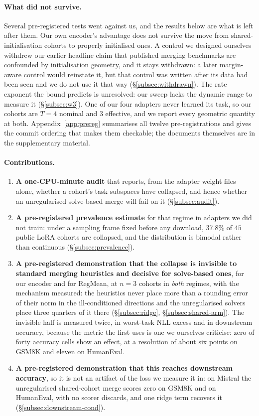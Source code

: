 \paragraph{What did not survive.} Several pre-registered tests went against
us, and the results below are what is left after them. Our own encoder's
advantage does not survive the move from shared-initialisation cohorts to
properly initialised ones. A control we designed ourselves withdrew our
earlier headline claim that published merging benchmarks are confounded by
initialisation geometry, and it stays withdrawn: a later margin-aware
control would reinstate it, but that control was written after its data had
been seen and we do not use it that way (\S\ref{subsec:withdrawn}). The rate exponent the bound predicts is unresolved:
our sweep lacks the dynamic range to measure it (\S\ref{subsec:w3}). One of our four adapters never learned its
task, so our cohorts are $T=4$ nominal and $3$ effective, and we report
every geometric quantity at both. Appendix~\ref{app:prereg} summarises all
twelve pre-registrations and gives the commit ordering that makes them
checkable;
the documents themselves are in the supplementary material.

\paragraph{Contributions.}
\begin{enumerate}
\item \textbf{A one-CPU-minute audit} that reports, from the adapter weight
  files alone, whether a cohort's task subspaces have collapsed, and hence
  whether an unregularised solve-based merge will fail on it
  (\S\ref{subsec:audit}).
\item \textbf{A pre-registered prevalence estimate} for that regime in
  adapters we did not train: under a sampling frame fixed before any
  download, $37.8\%$ of $45$ public LoRA cohorts are collapsed, and the
  distribution is bimodal rather than continuous
  (\S\ref{subsec:prevalence}).
\item \textbf{A pre-registered demonstration that the collapse is invisible
  to standard merging heuristics and decisive for solve-based ones}, for
  our encoder and for RegMean, at $n = 3$ cohorts in \emph{both} regimes,
  with the mechanism measured: the heuristics never place more than a
  rounding error of their norm in the ill-conditioned directions and the
  unregularised solvers place three quarters of it there
  (\S\ref{subsec:ridge}, \S\ref{subsec:shared-arm}). The invisible half
  is measured twice, in worst-task NLL excess and in downstream accuracy,
  because the metric the first uses is one we ourselves criticise: zero of
  forty accuracy cells show an effect, at a resolution of about six points
  on GSM8K and eleven on HumanEval.
\item \textbf{A pre-registered demonstration that this reaches downstream
  accuracy}, so it is not an artifact of the loss we measure it in: on
  Mistral the unregularised shared-cohort merge scores zero on GSM8K and on
  HumanEval, with no scorer discards, and one ridge term recovers it
  (\S\ref{subsec:downstream-cond}).
\end{enumerate}

